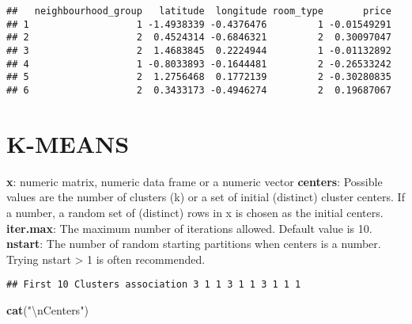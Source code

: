 \documentclass[
]{article}
\newenvironment{Shaded}{\begin{snugshade}}{\end{snugshade}}
\newcommand{\CharTok}[1]{\textcolor[rgb]{0.31,0.60,0.02}{#1}}
\newcommand{\DataTypeTok}[1]{\textcolor[rgb]{0.13,0.29,0.53}{#1}}
\newcommand{\DecValTok}[1]{\textcolor[rgb]{0.00,0.00,0.81}{#1}}
\newcommand{\KeywordTok}[1]{\textcolor[rgb]{0.13,0.29,0.53}{\textbf{#1}}}
\newcommand{\NormalTok}[1]{#1}
\newcommand{\OperatorTok}[1]{\textcolor[rgb]{0.81,0.36,0.00}{\textbf{#1}}}
\newcommand{\StringTok}[1]{\textcolor[rgb]{0.31,0.60,0.02}{#1}}
\begin{document}
\begin{verbatim}
##   neighbourhood_group   latitude  longitude room_type       price
## 1                   1 -1.4938339 -0.4376476         1 -0.01549291
## 2                   2  0.4524314 -0.6846321         2  0.30097047
## 3                   2  1.4683845  0.2224944         1 -0.01132892
## 4                   1 -0.8033893 -0.1644481         2 -0.26533242
## 5                   2  1.2756468  0.1772139         2 -0.30280835
## 6                   2  0.3433173 -0.4946274         2  0.19687067
\end{verbatim}

\hypertarget{k-means}{%
\section{K-MEANS}\label{k-means}}

\textbf{x}: numeric matrix, numeric data frame or a numeric vector
\textbf{centers}: Possible values are the number of clusters (k) or a
set of initial (distinct) cluster centers. If a number, a random set of
(distinct) rows in x is chosen as the initial centers.
\textbf{iter.max}: The maximum number of iterations allowed. Default
value is 10. \textbf{nstart}: The number of random starting partitions
when centers is a number. Trying nstart \textgreater{} 1 is often
recommended.

\begin{Shaded}
\end{Shaded}

\begin{verbatim}
## First 10 Clusters association 3 1 1 3 1 1 3 1 1 1
\end{verbatim}

\begin{Shaded}
\begin{Highlighting}[]
\KeywordTok{cat}\NormalTok{(}\StringTok{"}\CharTok{\textbackslash{}n}\StringTok{Centers"}\NormalTok{)}
\end{Highlighting}
\end{Shaded}
\end{document}
